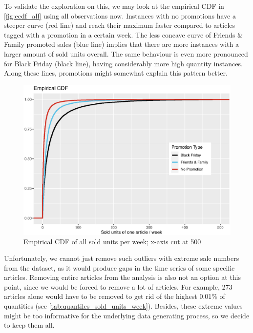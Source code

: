 To validate the exploration on this, we may look at the empirical \ac{CDF} in \autoref{fig:ecdf_all} using all observations now.
Instances with no promotions have a steeper curve (red line) and reach their maximum faster compared to articles tagged with a promotion in a certain week. The less concave curve of Friends \& Family promoted sales (blue line) implies that there are more instances with a larger amount of sold units overall. The same behaviour is even more pronounced for Black Friday (black line), having considerably more high quantity instances. Along these lines, promotions might somewhat explain this pattern better.\\
 
 
 \begin{figure}[H]
\centering
  \includegraphics[width=0.65\linewidth]{figures/ecdf_all.eps}
  \caption{Empirical \ac{CDF} of all sold units per week; x-axis cut at 500}
  \label{fig:ecdf_all}
\end{figure}



Unfortunately, we cannot just remove such outliers with extreme sale numbers from the dataset, as it would produce gaps in the time series of some specific articles. Removing entire articles from the analysis is also not an option at this point, since we would be forced to remove a lot of articles.
For example, 273 articles alone would have to be removed to get rid of the highest 0.01\% of quantities (see \autoref{tab:quantiles_sold_units_week}). Besides, these extreme values might be too informative for the underlying data generating process, so we decide to keep them all.








